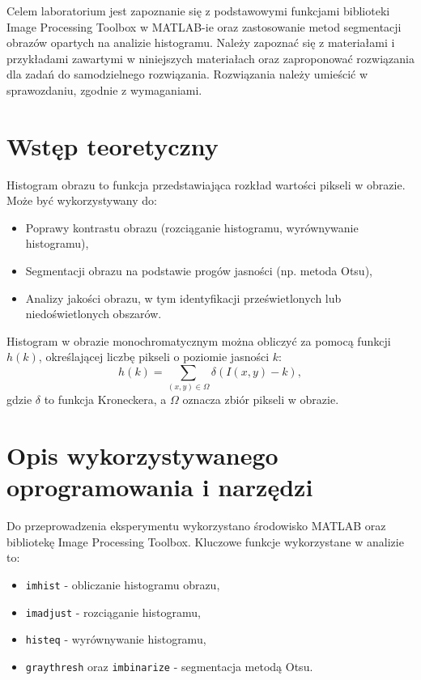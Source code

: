 Celem laboratorium jest zapoznanie się z podstawowymi funkcjami biblioteki Image Processing Toolbox w MATLAB-ie oraz zastosowanie metod segmentacji obrazów opartych na analizie histogramu. Należy zapoznać się z materiałami i przykładami zawartymi w niniejszych materiałach oraz zaproponować rozwiązania dla zadań do samodzielnego rozwiązania. Rozwiązania należy umieścić w sprawozdaniu, zgodnie z wymaganiami.

\section{Wstęp teoretyczny}
Histogram obrazu to funkcja przedstawiająca rozkład wartości pikseli w obrazie. Może być wykorzystywany do:
\begin{itemize}
	\item Poprawy kontrastu obrazu (rozciąganie histogramu, wyrównywanie histogramu),
	\item Segmentacji obrazu na podstawie progów jasności (np. metoda Otsu),
	\item Analizy jakości obrazu, w tym identyfikacji prześwietlonych lub niedoświetlonych obszarów.
\end{itemize}

Histogram w obrazie monochromatycznym można obliczyć za pomocą funkcji $h(k)$, określającej liczbę pikseli o poziomie jasności $k$:
\begin{equation}
	h(k) = \sum_{(x,y) \in \Omega} \delta(I(x,y) - k),
\end{equation}
gdzie $\delta$ to funkcja Kroneckera, a $\Omega$ oznacza zbiór pikseli w obrazie.

\section{Opis wykorzystywanego oprogramowania i narzędzi}
Do przeprowadzenia eksperymentu wykorzystano środowisko MATLAB oraz bibliotekę Image Processing Toolbox. Kluczowe funkcje wykorzystane w analizie to:
\begin{itemize}
	\item \texttt{imhist} - obliczanie histogramu obrazu,
	\item \texttt{imadjust} - rozciąganie histogramu,
	\item \texttt{histeq} - wyrównywanie histogramu,
	\item \texttt{graythresh} oraz \texttt{imbinarize} - segmentacja metodą Otsu.
\end{itemize}

